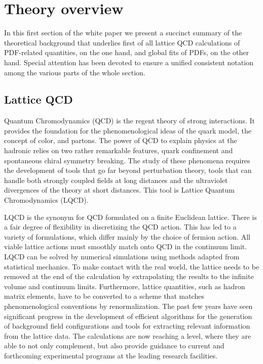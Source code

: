 
\section{Theory overview}
\label{sec:theoryoverview}

In this first section of the white paper we present a succinct
summary of the theoretical background that underlies
first of all lattice QCD calculations of PDF-related
quantities, on the one hand, and global fits
of PDFs, on the other hand.
%
Special attention has been devoted to ensure a unified
consistent notation among the various parts of the whole section.

\subsection{Lattice QCD}

\label{Sec:IntroLQCD}

Quantum Chromodynamics (QCD) is the regent theory of strong interactions. It provides the foundation 
for the phenomenological ideas of the quark model, the concept of color, and partons. 
The power of QCD to explain physics at the hadronic relies on two rather remarkable features,
quark confinement and spontaneous chiral symmetry breaking. The study
of these phenomena requires the development of tools that go far
beyond perturbation theory, tools that can handle both strongly
coupled fields at long distances and the ultraviolet divergences of
the theory at short distances. This tool is Lattice Quantum
Chromodynamics (LQCD).

LQCD is the synonym for QCD formulated on a finite Euclidean
lattice. There is a fair degree of flexibility in discretizing the QCD
action. This has led to a variety of formulations, which differ mainly
by the choice of fermion action. All viable lattice actions must
smoothly match onto QCD in the continuum limit. LQCD can be solved by
numerical simulations using methods adapted from statistical
mechanics. To make contact with the real world, the lattice needs to
be removed at the end of the calculation by extrapolating the results
to the infinite volume and continuum limits. Furthermore, lattice
quantities, such as hadron matrix elements, have to be converted to a
scheme that matches phenomenological conventions by
renormalization. The past few years have seen significant progress in
the development of efficient algorithms for the generation of
background field configurations and tools for extracting relevant
information from the lattice data. The calculations are now reaching a
level, where they are able to not only complement, but also provide
guidance to current and forthcoming experimental programs at the
leading research facilities.



